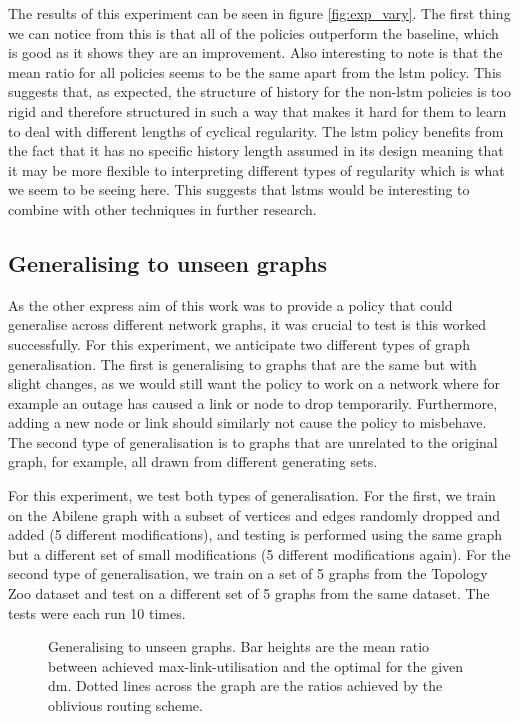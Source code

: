 The results of this experiment can be seen in figure \ref{fig:exp_vary}. The first thing we can notice from this is that all of the policies outperform the baseline, which is good as it shows they are an improvement. Also interesting to note is that the mean ratio for all policies seems to be the same apart from the \ac{lstm} policy. This suggests that, as expected, the structure of history for the non-\ac{lstm} policies is too rigid and therefore structured in such a way that makes it hard for them to learn to deal with different lengths of cyclical regularity. The \ac{lstm} policy benefits from the fact that it has no specific history length assumed in its design meaning that it may be more flexible to interpreting different types of regularity which is what we seem to be seeing here. This suggests that \acp{lstm} would be interesting to combine with other techniques in further research.

\subsection{Generalising to unseen graphs}
As the other express aim of this work was to provide a policy that could generalise across different network graphs, it was crucial to test is this worked successfully. For this experiment, we anticipate two different types of graph generalisation. The first is generalising to graphs that are the same but with slight changes, as we would still want the policy to work on a network where for example an outage has caused a link or node to drop temporarily. Furthermore, adding a new node or link should similarly not cause the policy to misbehave. The second type of generalisation is to graphs that are unrelated to the original graph, for example, all drawn from different generating sets.

For this experiment, we test both types of generalisation. For the first, we train on the Abilene graph with a subset of vertices and edges randomly dropped and added (5 different modifications), and testing is performed using the same graph but a different set of small modifications (5 different modifications again). For the second type of generalisation, we train on a set of 5 graphs from the Topology Zoo dataset and test on a different set of 5 graphs from the same dataset. The tests were each run 10 times.

\begin{figure}
    \centering
    
    \caption{Generalising to unseen graphs. Bar heights are the mean ratio between achieved max-link-utilisation and the optimal for the given \ac{dm}. Dotted lines across the graph are the ratios achieved by the oblivious routing scheme.}
    \label{fig:exp_graphs}
\end{figure}

